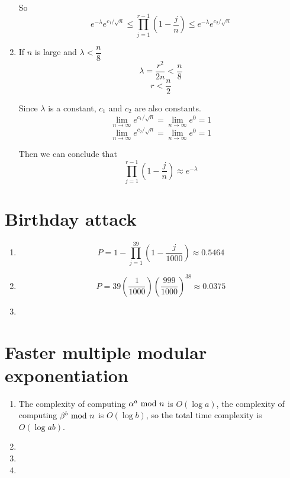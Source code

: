 \documentclass{article}
\renewcommand{\mod}{{\rm\ mod\ }}
\begin{document}
\begin{enumerate}
So $$e^{-\lambda}e^{c_1/\sqrt{n}} \leqslant \prod_{j=1}^{r-1} \left(1-\frac{j}{n}\right) \leqslant e^{-\lambda}e^{c_2/\sqrt{n}}$$

\item
If $n$ is large and $\lambda<\dfrac{n}{8}$
$$\lambda=\frac{r^2}{2n}<\frac{n}{8}$$
$$r<\frac{n}{2}$$

Since $\lambda$ is a constant, $c_1$ and $c_2$ are also constants.
$$\lim_{n\to\infty}e^{c_1/\sqrt{n}}=\lim_{n\to\infty}e^0=1$$
$$\lim_{n\to\infty}e^{c_2/\sqrt{n}}=\lim_{n\to\infty}e^0=1$$

Then we can conclude that
$$\prod_{j=1}^{r-1} \left(1-\frac{j}{n}\right) \approx e^{-\lambda}$$
\end{enumerate}

\section{Birthday attack}
\begin{enumerate}
\item
$$P=1-\prod_{j=1}^{39}\left(1-\frac{j}{1000}\right)\approx0.5464$$
\item
$$P=39\left(\frac{1}{1000}\right)\left(\frac{999}{1000}\right)^{38}\approx0.0375$$
\item

\end{enumerate}

\section{Faster multiple modular exponentiation}
\begin{enumerate}
\item
The complexity of computing $\alpha^a\mod n$ is $O(\log a)$, the complexity of computing $\beta^b\mod n$ is $O(\log b)$, so the total time complexity is $O(\log ab)$.
\item

\item
\item
\end{enumerate}
\end{document}
